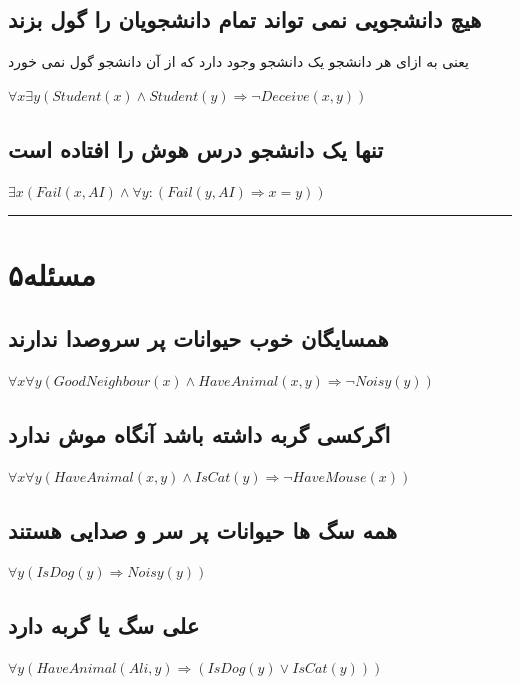 \documentclass{article}
\begin{document}
\subsection*{هیچ دانشجویی نمی تواند تمام دانشجویان را گول بزند }
یعنی به ازای هر دانشجو یک دانشجو وجود دارد که از آن دانشجو گول نمی خورد 
\begin{center}
	$ \forall x\exists y(Student(x) \land Student(y) \Rightarrow \neg Deceive(x,y))$
\end{center}
\subsection*{تنها یک دانشجو درس هوش را افتاده است }
\begin{center}
	$ \exists x(Fail(x,AI) \land \forall y : (Fail(y , AI) \Rightarrow x = y))$
\end{center}
\hrule
\section*{مسئله۵}
\subsection*{همسایگان خوب حیوانات پر سروصدا ندارند }
\begin{center}
	$ \forall x\forall y(GoodNeighbour(x) \land HaveAnimal(x,y) \Rightarrow \neg Noisy(y))$
\end{center}
\subsection*{اگرکسی گربه داشته باشد آنگاه موش ندارد }
\begin{center}
	$ \forall x\forall y(HaveAnimal(x,y) \land IsCat(y) \Rightarrow \neg HaveMouse(x))$
\end{center}
\subsection*{همه سگ ها حیوانات پر سر و صدایی هستند}
\begin{center}
	$ \forall y (IsDog(y) \Rightarrow Noisy(y))$
\end{center}
\subsection*{علی سگ یا گربه دارد }
\begin{center}
	$ \forall y(HaveAnimal(Ali,y)\Rightarrow (IsDog(y) \lor IsCat(y)))$
\end{center}
\end{document}
